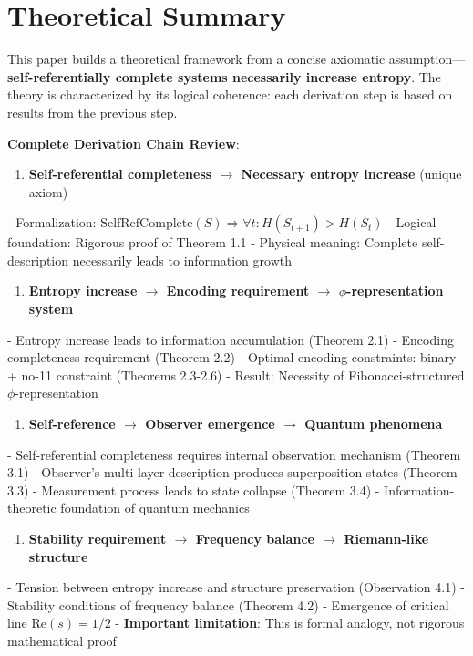 
\section{Theoretical Summary}
\label{sec:ch06_conclusion:theoretical-summary}

This paper builds a theoretical framework from a concise axiomatic assumption---\textbf{self-referentially complete systems necessarily increase entropy}. The theory is characterized by its logical coherence: each derivation step is based on results from the previous step.

\textbf{Complete Derivation Chain Review}:

\begin{enumerate}
\item \textbf{Self-referential completeness $\rightarrow$ Necessary entropy increase} (unique axiom)
\end{enumerate}
   - Formalization: $\text{SelfRefComplete}(S) \Rightarrow \forall t: H(S_{t+1}) > H(S_t)$
   - Logical foundation: Rigorous proof of Theorem 1.1
   - Physical meaning: Complete self-description necessarily leads to information growth

\begin{enumerate}
\item \textbf{Entropy increase $\rightarrow$ Encoding requirement $\rightarrow$ $\phi$-representation system}
\end{enumerate}
   - Entropy increase leads to information accumulation (Theorem 2.1)
   - Encoding completeness requirement (Theorem 2.2)
   - Optimal encoding constraints: binary + no-11 constraint (Theorems 2.3-2.6)
   - Result: Necessity of Fibonacci-structured $\phi$-representation

\begin{enumerate}
\item \textbf{Self-reference $\rightarrow$ Observer emergence $\rightarrow$ Quantum phenomena}
\end{enumerate}
   - Self-referential completeness requires internal observation mechanism (Theorem 3.1)
   - Observer's multi-layer description produces superposition states (Theorem 3.3)
   - Measurement process leads to state collapse (Theorem 3.4)
   - Information-theoretic foundation of quantum mechanics

\begin{enumerate}
\item \textbf{Stability requirement $\rightarrow$ Frequency balance $\rightarrow$ Riemann-like structure}
\end{enumerate}
   - Tension between entropy increase and structure preservation (Observation 4.1)
   - Stability conditions of frequency balance (Theorem 4.2)
   - Emergence of critical line $\text{Re}(s)=1/2$
   - \textbf{Important limitation}: This is formal analogy, not rigorous mathematical proof

